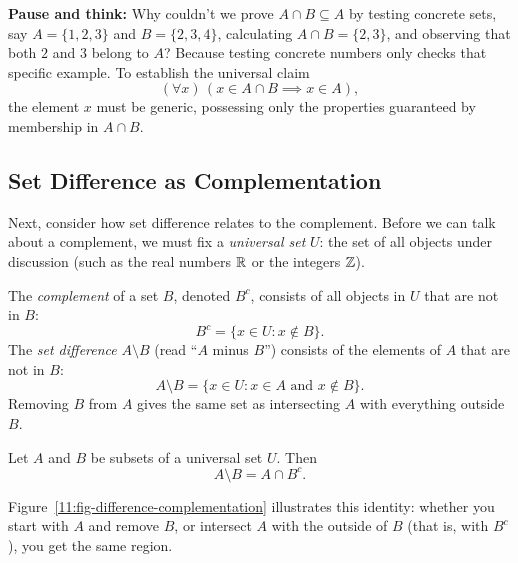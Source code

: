 \begin{intuitionbox}
\textbf{Pause and think:} Why couldn't we prove $A \cap B \subseteq A$ by testing concrete sets, say $A = \{1, 2, 3\}$ and $B = \{2, 3, 4\}$, calculating $A \cap B = \{2, 3\}$, and observing that both $2$ and $3$ belong to $A$? Because testing concrete numbers only checks that specific example. To establish the universal claim
\[
(\forall x)\,(x \in A \cap B \implies x \in A),
\]
the element $x$ must be generic, possessing only the properties guaranteed by membership in $A \cap B$.
\end{intuitionbox}

\subsection{Set Difference as Complementation}

Next, consider how set difference relates to the complement. Before we can talk about a complement, we must fix a \emph{universal set} $U$: the set of all objects under discussion (such as the real numbers $\mathbb{R}$ or the integers $\mathbb{Z}$).

The \emph{complement} of a set $B$, denoted $B^c$, consists of all objects in $U$ that are not in $B$:
\[
B^c = \{x \in U : x \notin B\}.
\]
The \emph{set difference} $A \setminus B$ (read ``$A$ minus $B$'') consists of the elements of $A$ that are not in $B$:
\[
A \setminus B = \{x \in U : x \in A \text{ and } x \notin B\}.
\]
Removing $B$ from $A$ gives the same set as intersecting $A$ with everything outside $B$.

\begin{theorem}
Let $A$ and $B$ be subsets of a universal set $U$. Then
\[
A \setminus B = A \cap B^c.
\]
\end{theorem}

Figure~\ref{11:fig-difference-complementation} illustrates this identity: whether you start with $A$ and remove $B$, or intersect $A$ with the outside of $B$ (that is, with $B^c$), you get the same region.

